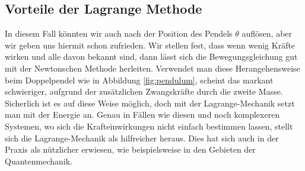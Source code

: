 \subsection{Vorteile der Lagrange Methode}
In diesem Fall könnten wir auch nach der Position des Pendels \(\theta\) auflösen,
aber wir geben uns hiermit schon zufrieden.
Wir stellen fest, dass wenn wenig Kräfte wirken und alle davon bekannt sind,
dann lässt sich die Bewegungsgleichung gut mit der Newtonschen Methode herleiten.
Verwendet man diese Herangehensweise beim Doppelpendel wie in Abbildung \ref{fig:pendulum},
scheint das markant schwieriger, aufgrund der zusätzlichen Zwangskräfte durch die zweite Masse.
Sicherlich ist es auf diese Weise möglich, doch mit der Lagrange-Mechanik setzt man mit der Energie an.
Genau in Fällen wie diesen und noch komplexeren Systemen, wo sich die Krafteinwirkungen nicht einfach
bestimmen lassen, stellt sich die Lagrange-Mechanik als hilfreicher heraus.
Dies hat sich auch in der Praxis als nützlicher erwiesen, wie beispielsweise 
in den Gebieten der Quantenmechanik.%
